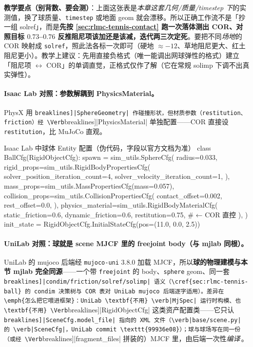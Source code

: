 \textbf{教学要点（别背数、要会测）}：上面这张表是\emph{本章这套几何/质量/timestep 下}的实测值，换了球质量、\verb|timestep| 或地面 geom 就会漂移。所以正确工作流不是「抄一组 solref」，而是\textbf{先按 \cref{sec:rlmc-tennis-contact} 跑一次落体测出 COR、对照目标 $0.73$--$0.76$ 反推阻尼项该加还是该减，迭代两三次定死}。要把不同\emph{场地}的 COR 映射成 \verb|solref|，照此法各标一次即可（硬地 $\approx-12$、草地阻尼更大、红土阻尼更小）。教学上建议：先用直接负格式（唯一能调出网球弹性的格式）建立「阻尼项 $\leftrightarrow$ COR」的单调直觉，正格式仅作了解（它在常规 solimp 下调不出真实弹性）。

\paragraph{Isaac Lab 对照：参数解耦到 PhysicsMaterial。}PhysX 用 \Verb[breaklines]|SphereGeometry| 作碰撞形状，但材质参数（restitution、friction）经 \Verb[breaklines]|PhysicsMaterial| 单独配置——COR 直接设 \verb|restitution|，比 MuJoCo 直观。

\begin{codebox}[Python]{Isaac Lab 中球体 Entity 配置（伪代码，字段以官方文档为准）}
class BallCfg(RigidObjectCfg):
    spawn = sim_utils.SphereCfg(
        radius=0.033,
        rigid_props=sim_utils.RigidBodyPropertiesCfg(
            solver_position_iteration_count=4,
            solver_velocity_iteration_count=1,
        ),
        mass_props=sim_utils.MassPropertiesCfg(mass=0.057),
        collision_props=sim_utils.CollisionPropertiesCfg(
            contact_offset=0.002, rest_offset=0.0,
        ),
        physics_material=sim_utils.RigidBodyMaterialCfg(
            static_friction=0.6, dynamic_friction=0.6, restitution=0.75,  # ← COR 直控
        ),
    )
    init_state = RigidObjectCfg.InitialStateCfg(pos=(11.0, 0.0, 2.5))
\end{codebox}

\paragraph{UniLab 对照：球就是 scene MJCF 里的 freejoint body（与 mjlab 同根）。}UniLab 的 mujoco 后端经 \verb|mujoco-uni| 3.8.0 加载 MJCF，所以\textbf{球的物理建模与本节 mjlab 完全同源}——一个带 \verb|freejoint| 的 body、\verb|sphere| geom、同一套 \Verb[breaklines]|condim/friction/solref/solimp| 语义（\cref{sec:rlmc-tennis-ball} 的 condim 决策树与 COR 表对 UniLab mujoco 后端逐字适用）。差异在\emph{怎么把它喂进框架}：UniLab \textbf{不用} \verb|MjSpec| 运行时构模、也\textbf{不用} \Verb[breaklines]|RigidObjectCfg| 这类资产配置类——它只认 \Verb[breaklines]|SceneCfg.model_file| 指向的 XML 文件（\verb|base/scene.py| 的 \verb|SceneCfg|，UniLab commit \texttt{99936e08}）；球与球场写在同一份（或经 \Verb[breaklines]|fragment_files| 拼装的）MJCF 里，由后端一次性\emph{编译}\,\cite{unilab2026}。

